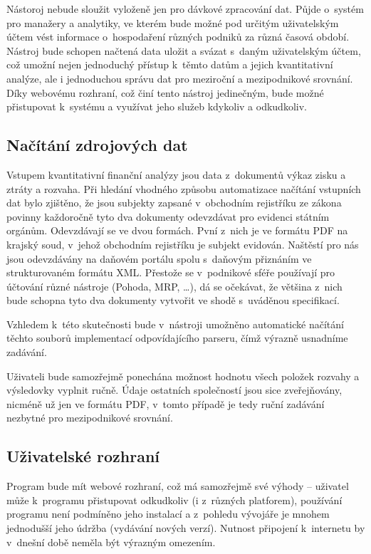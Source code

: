 Nástoroj nebude sloužit vyloženě jen pro dávkové zpracování dat. Půjde o~systém pro manažery a analytiky, ve kterém bude možné pod určitým uživatelským účtem vést informace o~hospodaření různých podniků za různá časová období. Nástroj bude schopen načtená data uložit a svázat s~daným uživatelským účtem, což umožní nejen jednoduchý přístup k~těmto datům a jejich kvantitativní analýze, ale i jednoduchou správu dat pro meziroční a mezipodnikové srovnání. Díky webovému rozhraní, což činí tento nástroj jedinečným, bude možné přistupovat k~systému a využívat jeho služeb kdykoliv a odkudkoliv.

\subsection{Načítání zdrojových dat}
Vstupem kvantitativní finanční analýzy jsou data z~dokumentů výkaz zisku a ztráty a rozvaha. Při hledání vhodného způsobu automatizace načítání vstupních dat bylo zjištěno, že jsou subjekty zapsané v~obchodním rejistříku ze zákona povinny každoročně tyto dva dokumenty odevzdávat pro evidenci státním orgánům. 
Odevzdávají se ve dvou formách. Pvní z~nich je ve formátu PDF na krajský soud, v~jehož obchodním rejistříku je subjekt evidován. Naštěstí pro nás jsou odevzdávány na daňovém portálu spolu s~daňovým přiznáním ve strukturovaném formátu XML. Přestože se v~podnikové sféře používají pro účtování různé nástroje (Pohoda, MRP, \dots), dá se očekávat, že většina z~nich bude schopna tyto dva dokumenty vytvořit ve shodě s~uváděnou specifikací.

Vzhledem k~této skutečnosti bude v~nástroji umožněno automatické načítání těchto souborů implementací odpovídajícího parseru,  čímž výrazně usnadníme zadávání.

Uživateli bude samozřejmě ponechána možnost hodnotu všech položek rozvahy a výsledovky vyplnit ručně. Údaje ostatních společností jsou sice zveřejňovány, nicméně už jen ve formátu PDF, v~tomto případě je tedy ruční zadávání nezbytné pro mezipodnikové srovnání.

\subsection{Uživatelské rozhraní}
Program bude mít webové rozhraní, což má samozřejmě své výhody -- uživatel může k~programu přistupovat odkudkoliv (i z~různých platforem), používání programu není podmíněno jeho instalací a z~pohledu vývojáře je mnohem jednodušší jeho údržba (vydávání nových verzí). Nutnost připojení k~internetu by v~dnešní době neměla být výrazným omezením.

